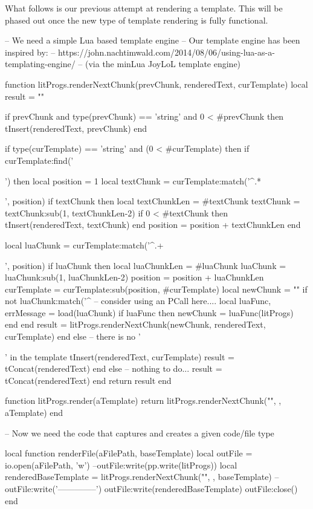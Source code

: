 {{What follows is our previous attempt at rendering a template. This will be 
phased out once the new type of template rendering is fully functional. 

\startLuaCode

-- We need a simple Lua based template engine
-- Our template engine has been inspired by:
--   https://john.nachtimwald.com/2014/08/06/using-lua-as-a-templating-engine/
-- (via the minLua JoyLoL template engine)

function litProgs.renderNextChunk(prevChunk, renderedText, curTemplate)
  local result = ""
  
  if prevChunk
    and type(prevChunk) == 'string'
    and 0 < #prevChunk then
    tInsert(renderedText, prevChunk)
  end
  
  if type(curTemplate) == 'string' and (0 < #curTemplate) then
    if curTemplate:find('{{') then
      local position  = 1
      local textChunk = curTemplate:match('^.*{{', position)
      if textChunk then 
        local textChunkLen = #textChunk
        textChunk = textChunk:sub(1, textChunkLen-2)
        if 0 < #textChunk then tInsert(renderedText, textChunk) end
        position = position + textChunkLen
      end
      
      local luaChunk = curTemplate:match('^.+}}', position)
      if luaChunk then
        local luaChunkLen = #luaChunk
        luaChunk = luaChunk:sub(1, luaChunkLen-2)
        position = position + luaChunkLen
        curTemplate = curTemplate:sub(position, #curTemplate)
        local newChunk = ""
        if not luaChunk:match('^%
          -- consider using an PCall here....
          local luaFunc, errMessage = load(luaChunk)
          if luaFunc then
            newChunk = luaFunc(litProgs)
          end
        end
        result = litProgs.renderNextChunk(newChunk, renderedText, curTemplate)
      end
    else -- there is no '{{' in the template
      tInsert(renderedText, curTemplate)
      result = tConcat(renderedText)
    end
  else
    -- nothing to do...
    result = tConcat(renderedText)
  end
  return result
end

function litProgs.render(aTemplate)
  return litProgs.renderNextChunk("", { }, aTemplate)
end

-- Now we need the code that captures and creates a given code/file type 

local function renderFile(aFilePath, baseTemplate)
  local outFile = io.open(aFilePath, 'w')
  --outFile:write(pp.write(litProgs))
  local renderedBaseTemplate = litProgs.renderNextChunk("", {}, baseTemplate)
  --outFile:write('\n--------------\n')
  outFile:write(renderedBaseTemplate)
  outFile:close()
end

}}}}}}
